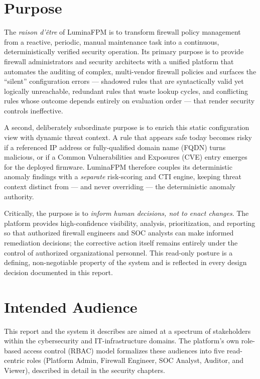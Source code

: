 \section{Purpose}
\label{sec:ch1-purpose}

The \emph{raison d'\^etre} of LuminaFPM is to transform firewall policy management from a reactive, periodic, manual maintenance task into a continuous, deterministically verified security operation. Its primary purpose is to provide firewall administrators and security architects with a unified platform that automates the auditing of complex, multi-vendor firewall policies and surfaces the ``silent'' configuration errors --- shadowed rules that are syntactically valid yet logically unreachable, redundant rules that waste lookup cycles, and conflicting rules whose outcome depends entirely on evaluation order --- that render security controls ineffective.

A second, deliberately subordinate purpose is to enrich this static configuration view with dynamic threat context. A rule that appears safe today becomes risky if a referenced IP address or fully-qualified domain name (FQDN) turns malicious, or if a Common Vulnerabilities and Exposures (CVE) entry emerges for the deployed firmware. LuminaFPM therefore couples its deterministic anomaly findings with a \emph{separate} risk-scoring and CTI engine, keeping threat context distinct from --- and never overriding --- the deterministic anomaly authority.

Critically, the purpose is to \emph{inform human decisions, not to enact changes}. The platform provides high-confidence visibility, analysis, prioritization, and reporting so that authorized firewall engineers and SOC analysts can make informed remediation decisions; the corrective action itself remains entirely under the control of authorized organizational personnel. This read-only posture is a defining, non-negotiable property of the system and is reflected in every design decision documented in this report.

\section{Intended Audience}
\label{sec:ch1-audience}

This report and the system it describes are aimed at a spectrum of stakeholders within the cybersecurity and IT-infrastructure domains. The platform's own role-based access control (RBAC) model formalizes these audiences into five read-centric roles (Platform Admin, Firewall Engineer, SOC Analyst, Auditor, and Viewer), described in detail in the security chapters.

